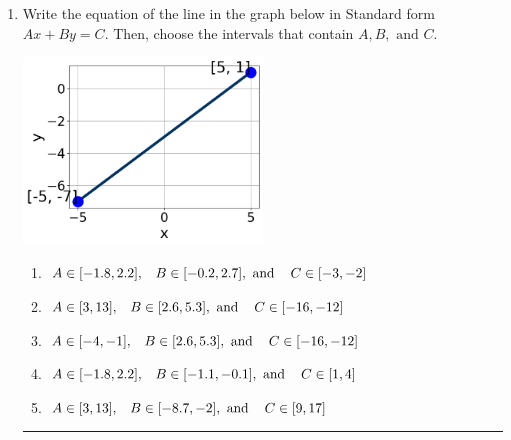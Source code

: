 \documentclass[14pt]{extbook}
\newcommand{\litem}[1]{\item#1\hspace*{-1cm}\rule{\textwidth}{0.4pt}}
\begin{document}
\begin{enumerate}
\litem{
Write the equation of the line in the graph below in Standard form $Ax+By=C$. Then, choose the intervals that contain $A, B, \text{ and } C$.
\begin{center}
    \includegraphics[width=0.5\textwidth]{../Figures/linearGraphToStandardB.png}
\end{center}
\begin{enumerate}[label=\Alph*.]
\item \( A \in [-1.8, 2.2], \hspace{3mm} B \in [-0.2, 2.7], \text{ and } \hspace{3mm} C \in [-3, -2] \)
\item \( A \in [3, 13], \hspace{3mm} B \in [2.6, 5.3], \text{ and } \hspace{3mm} C \in [-16, -12] \)
\item \( A \in [-4, -1], \hspace{3mm} B \in [2.6, 5.3], \text{ and } \hspace{3mm} C \in [-16, -12] \)
\item \( A \in [-1.8, 2.2], \hspace{3mm} B \in [-1.1, -0.1], \text{ and } \hspace{3mm} C \in [1, 4] \)
\item \( A \in [3, 13], \hspace{3mm} B \in [-8.7, -2], \text{ and } \hspace{3mm} C \in [9, 17] \)


\end{enumerate}}
\end{enumerate}
\end{document}
